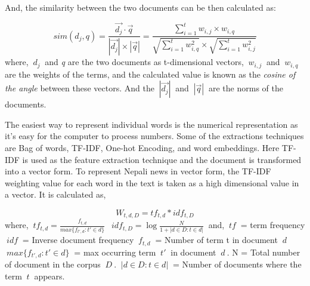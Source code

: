 \documentclass[12pt]{report}
\begin{document}
        And, the similarity between the two documents can be then calculated as:

            \begin{equation}
                  sim(d_j, q) =  \frac{  \vec{d_j} \cdot \vec{q}  } {|\vec{d_j}|  \times |\vec{q}|  }
                = \frac{\sum_{i=1}^{t}w_{i,j}\times w_{i,q}} {\sqrt{\sum_{i=1}^{t}w_{i,q}^2} \times \sqrt{\sum_{i=1}^{t}w_{i,j}^2}}
            \end{equation}
            where, \textit{$~{d_j}~$} and \emph{q} are the two documents as t-dimensional vectors, $~{w_{i,j}}~$ and $~{w_{i,q}}~$ are the weights of the terms, and the calculated value is known
            as the \emph{cosine of the angle} between these vectors\cite{baeza1999modern}. And the $~{|\vec{d_j}|}~$ and $~{|\vec{q}|}~$ are the norms of the documents.

            The easiest way to represent individual words is the numerical representation as it's easy for the computer to process numbers. Some of
        the extractions techniques are Bag of words, TF-IDF, One-hot Encoding, and word embeddings.
        Here TF-IDF\cite{schutze2008introduction} is used as the feature extraction technique and the document is transformed into a vector form.
        To represent Nepali news in vector form, the TF-IDF weighting value for each word in the text is taken as a high dimensional
        value in a vector. It is calculated as,

        \begin{equation} W_{t, d, D} = tf_{t, d} * idf_{t, D} \end{equation}
         where,\newline
        $~{tf_{t, d} = \frac{f_{t,d}}{max\{f_{t', d} : t' \in d\}}}~$ \newline
        $~{idf_{t, D} = \log \frac{N}{1+  | {d \in D: t \in d}  |}}~$ \newline
            and,\newline
        $~{tf}~$ = term frequency\newline
        $~{idf}~$ = Inverse document frequency\newline
        $~{f_{t,d}}~$ = Number of term t in document $~{d}~$\newline
        $~{max\{f_{t', d} : t' \in d\} }~$ = max occurring term $~{t'}~$ in document $~{d}~$.\newline
        N = Total number of document in the corpus $~{D}~$.\newline
        $~{|{d \in D: t \in d}|}~$ = Number of documents where the term $~{t}~$ appears. \newline
\end{document}

